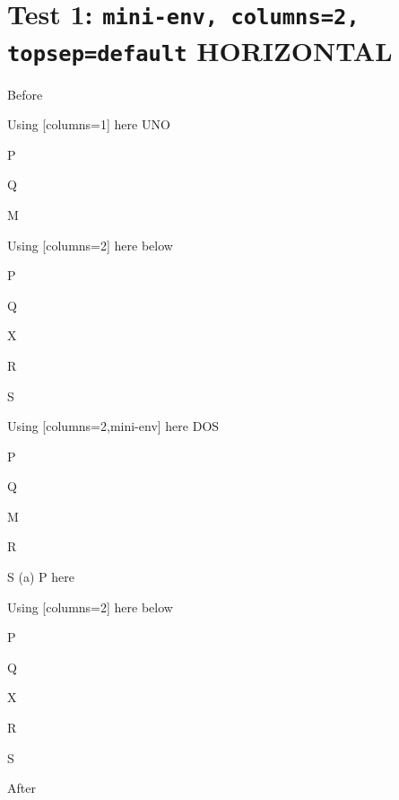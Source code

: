 \documentclass[10pt]{article}
\begin{document}

\section{Test 1: \texttt{mini-env, columns=2, topsep=default} HORIZONTAL}

Before
\begin{enumext}[columns=2]

\item Using [columns=1] here UNO
  \begin{enumext}[columns=1]%
     \item  P \item Q \item M %
  \end{enumext}

\item Using [columns=2] here below
\begin{enumext}[columns=2]%
     \item  P \item Q \item X  \item R \item S
  \end{enumext}

\columnbreak

\item Using [columns=2,mini-env] here DOS
  \begin{enumext}[columns=2,mini-env={0.4\linewidth}]%
    \item  P \item Q \item M \item R \item S
    \miniright
    (a) P here
  \end{enumext}

\item Using [columns=2] here below
\begin{enumext}[columns=2]%
     \item  P \item Q \item X  \item R \item S
  \end{enumext}

\end{enumext}
After
\end{document}
